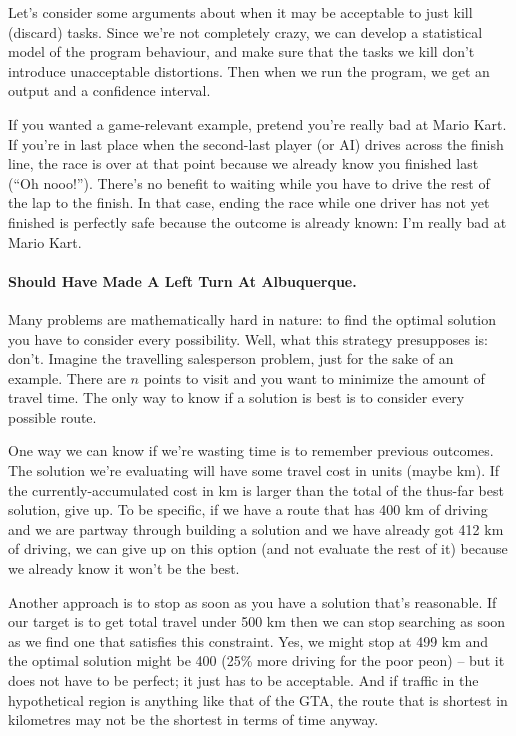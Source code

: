 Let's consider some arguments about when it may be acceptable to just
kill (discard) tasks. Since we're not completely crazy, we can develop
a statistical model of the program behaviour, and make sure that the
tasks we kill don't introduce unacceptable distortions. Then when we
run the program, we get an output and a confidence interval.

If you wanted a game-relevant example, pretend you're really bad at Mario Kart. If you're in last place when the second-last player (or AI) drives across the finish line, the race is over at that point because we already know you finished last (``Oh nooo!''). There's no benefit to waiting while you have to drive the rest of the lap to the finish. In that case, ending the race while one driver has not yet finished is perfectly safe because the outcome is already known: I'm really bad at Mario Kart.

\paragraph{Should Have Made A Left Turn At Albuquerque.} 
Many problems are mathematically hard in nature: to find the optimal solution you have to consider every possibility. Well, what this strategy presupposes is: don't. Imagine the travelling salesperson problem, just for the sake of an example. There are $n$ points to visit and you want to minimize the amount of travel time. The only way to know if a solution is best is to consider every possible route.

One way we can know if we're wasting time is to remember previous outcomes. The solution we're evaluating will have some travel cost in units (maybe km). If the currently-accumulated cost in km is larger than the total of the thus-far best solution, give up. To be specific, if we have a route that has 400 km of driving and we are partway through building a solution and we have already got 412 km of driving, we can give up on this option (and not evaluate the rest of it) because we already know it won't be the best.

Another approach is to stop as soon as you have a solution that's reasonable. If our target is to get total travel under 500 km then we can stop searching as soon as we find one that satisfies this constraint. Yes, we might stop at 499 km and the optimal solution might be 400 (25\% more driving for the poor peon) -- but it does not have to be perfect; it just has to be acceptable. And if traffic in the hypothetical region is anything like that of the GTA, the route that is shortest in kilometres may not be the shortest in terms of time anyway.

